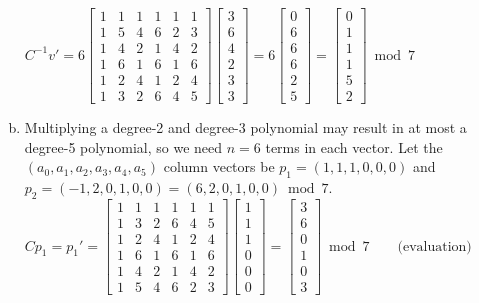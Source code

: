 \documentclass[11pt]{article}
\begin{document}
\begin{enumerate}[(a)]
$C^{-1}v' = 6\begin{bmatrix}1&1&1&1&1&1\\1&5&4&6&2&3\\1&4&2&1&4&2\\1&6&1&6&1&6\\1&2&4&1&2&4\\1&3&2&6&4&5\end{bmatrix}\begin{bmatrix}3\\6\\4\\2\\3\\3\end{bmatrix} = 6\begin{bmatrix}0\\6\\6\\6\\2\\5\end{bmatrix} = \begin{bmatrix}0\\1\\1\\1\\5\\2\end{bmatrix}\bmod 7$
\newpage
\item Multiplying a degree-2 and degree-3 polynomial may result in at most a degree-5 polynomial, so we need $n=6$ terms in each vector. Let the $(a_0,a_1,a_2,a_3,a_4,a_5)$ column vectors be $p_1=(1,1,1,0,0,0)$ and $p_2=(-1,2,0,1,0,0)=(6,2,0,1,0,0)\bmod 7$. \\
$Cp_1 = p_1' = \begin{bmatrix}1&1&1&1&1&1\\1&3&2&6&4&5\\1&2&4&1&2&4\\1&6&1&6&1&6\\1&4&2&1&4&2\\1&5&4&6&2&3\end{bmatrix}\begin{bmatrix}1\\1\\1\\0\\0\\0\end{bmatrix}=\begin{bmatrix}3\\6\\0\\1\\0\\3\end{bmatrix}\bmod 7 \qquad \text{(evaluation)}$ \\

\end{enumerate}
\end{document}
